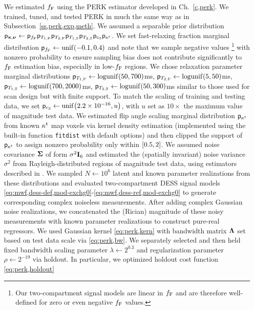 We estimated $f_{\mathrm{F}}$ 
using the PERK estimator
developed in Ch.~\ref{c,perk}.
We trained, tuned, and tested PERK
in much the same way 
as in Subsection~\ref{ss,perk,exp,meth}.
We assumed a separable prior distribution
$\mathsf{p}_{\mathbf{x},\boldsymbol{\nu}} \gets 
	\mathsf{p}_{f_{\mathrm{F}}}\mathsf{p}_{T_{1,\mathrm{F}}}\mathsf{p}_{T_{2,\mathrm{F}}}
	\mathsf{p}_{T_{1,\mathrm{S}}}\mathsf{p}_{T_{2,\mathrm{S}}}\mathsf{p}_{c_{3}}\mathsf{p}_{\kappa^{\mathrm{t}}}$.
We set fast-relaxing fraction marginal distribution 
$\dist{\ff} \gets \unif{-0.1,0.4}$ 
and note that we sample negative values
\footnote{%
	Our two-compartment signal models
	are linear in $f_{\mathrm{F}}$
	and are therefore well-defined
	for zero or even negative $f_{\mathrm{F}}$ values.
}
with nonzero probability
to ensure sampling bias
does not contribute significantly
to $f_{\mathrm{F}}$ estimation bias,
especially in low-$f_{\mathrm{F}}$ regions.
We chose relaxation parameter marginal distributions
$\dist{\tf{1}} \gets \logunif{50,700}$ms,
$\dist{\tf{2}} \gets \logunif{5,50}$ms,
$\dist{\ts{1}} \gets \logunif{700,2000}$ms,
$\dist{\ts{2}} \gets \logunif{50,300}$ms
similar to those 
used for scan design
but with finite support.
To match the scaling 
of training and testing data,
we set $\dist{\const{3}} \gets \unif{2.2 \times 10^{-16},u}$,
with $u$ set as $10\times$ the maximum value 
of magnitude test data.
We estimated flip angle scaling marginal distribution $\mathsf{p}_{\kappa^{\mathrm{t}}}$
from known $\kappa^{\mathrm{t}}$ map voxels
via kernel density estimation 
(implemented using the built-in \matlab function \texttt{fitdist}
with default options)
and then clipped the support of $\mathsf{p}_{\kappa^{\mathrm{t}}}$
to assign nonzero probability
only within $\brac{0.5,2}$.
We assumed noise covariance $\boldsymbol{\Sigma}$
of form $\sigma^2 \mathbf{I}_{6}$ 
and estimated the (spatially invariant) noise variance $\sigma^2$
from Rayleigh-distributed regions
of magnitude test data,
using estimators described 
in \cite{siddiqui:64:sif}.
We sampled $N \gets 10^6$ latent and known parameter realizations
from these distributions
and evaluated two-compartment DESS signal models
\eqref{eq:mwf,dess-def,mod-exchg0}-\eqref{eq:mwf,dess-ref,mod-exchg0}
to generate corresponding complex noiseless measurements.
After adding complex Gaussian noise realizations,
we concatenated the (Rician) magnitude 
of these noisy measurements
with known parameter realizations
to construct pure-real regressors.
We used Gaussian kernel \eqref{eq:perk,kern}
with bandwidth matrix $\boldsymbol{\Lambda}$ 
set based on test data scale
via \eqref{eq:perk,bw}.
We separately selected 
and then held fixed 
bandwidth scaling parameter $\lambda \gets 2^{0.3}$ 
and regularization parameter $\rho \gets 2^{-19}$ 
via holdout.
In particular,
we optimized holdout cost function \eqref{eq:perk,holdout}
